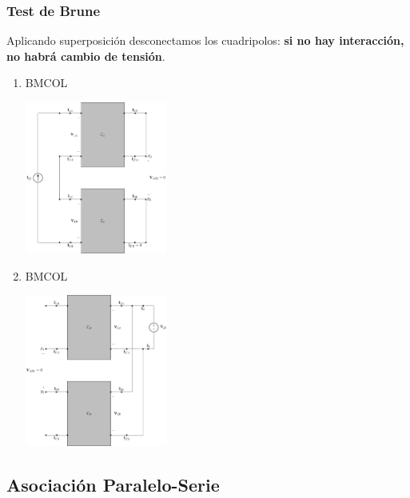 \subsubsection{Test de Brune}
\label{sec:orgb1acd8e}
Aplicando superposición desconectamos los cuadripolos: \textbf{si no hay interacción, no habrá cambio de tensión}.
\begin{enumerate}
\item \hfill{}\textsc{BMCOL}
\label{sec:orge70fe59}

\includegraphics[height=5cm]{../figs/serie-paralelo-brune-entrada.pdf}

\item \hfill{}\textsc{BMCOL}
\label{sec:orgfd2f144}

\includegraphics[height=5cm]{../figs/serie-paralelo-brune-salida.pdf}

\end{enumerate}

\subsection{Asociación Paralelo-Serie}
\label{sec:orgd91e058}
